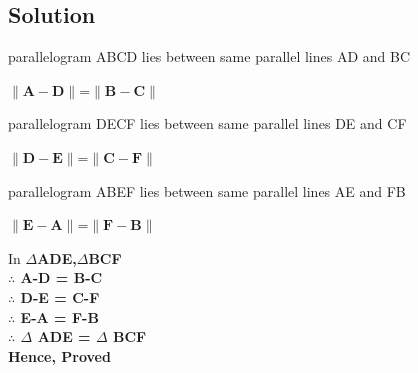 \documentclass[10pt,a4paper]{report}
\newcommand{\myvec}[1]{\ensuremath{\begin{pmatrix}#1\end{pmatrix}}}
\let\vec\mathbf
\let\myvec\bf
\let\vec\mathbf
\begin{document}
\begin{multicols}{2}
 \section{Solution}
parallelogram ABCD  lies  between same parallel lines AD and BC\\
\begin{center}
$\lVert\vec{A-D}\rVert$=$\lVert\vec{B-C}\rVert$\\
\end{center}
 parallelogram DECF  lies  between same parallel lines DE and CF\\
\begin{center}
$\lVert\vec{D-E}\rVert$=$\lVert\vec{C-F}\rVert$\\ 
\end{center}
 parallelogram ABEF  lies  between same parallel lines AE and FB\\
\begin{center}
$\lVert\vec{E-A}\rVert$=$\lVert\vec{F-B}\rVert$\\
\end{center}
\begin{center}
In
\myvec{$\Delta$ADE},\myvec{$\Delta$BCF} \\
$\therefore$\myvec{ A-D = B-C } \\
$\therefore$\myvec{ D-E = C-F } \\
$\therefore$\myvec{ E-A = F-B } \\
$\therefore$ $\Delta$ ADE = $\Delta$ BCF\\

Hence, Proved \\
\
\\
\
\\
\end{center}
\vspace{1mm}


\end{multicols}
\end{document}
